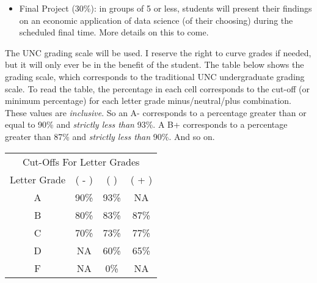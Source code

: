 \documentclass[11pt]{article}
\begin{document}
\begin{itemize}
    \item Final Project (30\%): in groups of 5 or less, students will present their findings on an economic application of data science (of their choosing) during the scheduled final time. More details on this to come.
\end{itemize}

The UNC grading scale will be used. I reserve the right to curve grades if needed, but it will only ever be in the benefit of the student. The table below shows the grading scale, which corresponds to the traditional UNC undergraduate grading scale. To read the table, the percentage in each cell corresponds to the cut-off (or minimum percentage) for each letter grade minus/neutral/plus combination. These values are \textit{inclusive}. So an A- corresponds to a percentage greater than or equal to 90\% and \textit{strictly less than} 93\%. A B+ corresponds to a percentage greater than 87\% and \textit{strictly less than} 90\%. And so on. 

\begin{table}[H]
\centering
\begin{tabular}{@{}cccc@{}} \toprule
\multicolumn{4}{c}{Cut-Offs For Letter Grades} \\ \cmidrule(r){1-4}
Letter Grade & ( - ) & (  ) & ( + ) \\ \midrule
A & 90\% & 93\% & NA \\ 
B & 80\% & 83\% & 87\% \\
C & 70\% & 73\% & 77\% \\
D & NA & 60\% & 65\% \\
F & NA & 0\% & NA \\ \bottomrule
\end{tabular}
\end{table}



  
\newpage


\end{document}
